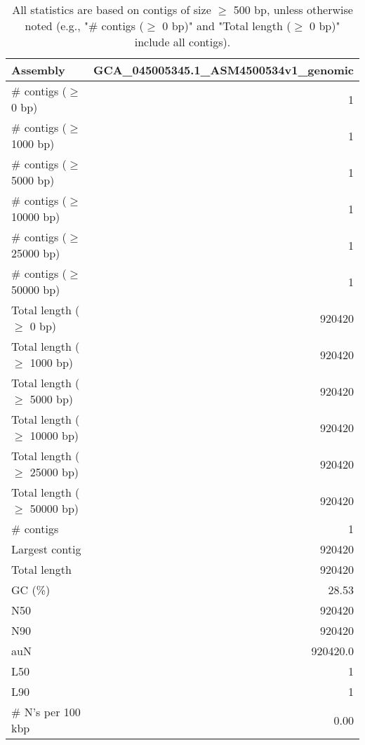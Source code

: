 \documentclass[12pt,a4paper]{article}
\begin{document}
\begin{table}[ht]
\begin{center}
\caption{All statistics are based on contigs of size $\geq$ 500 bp, unless otherwise noted (e.g., "\# contigs ($\geq$ 0 bp)" and "Total length ($\geq$ 0 bp)" include all contigs).}
\begin{tabular}{|l*{1}{|r}|}
\hline
Assembly & GCA\_045005345.1\_ASM4500534v1\_genomic \\ \hline
\# contigs ($\geq$ 0 bp) & 1 \\ \hline
\# contigs ($\geq$ 1000 bp) & 1 \\ \hline
\# contigs ($\geq$ 5000 bp) & 1 \\ \hline
\# contigs ($\geq$ 10000 bp) & 1 \\ \hline
\# contigs ($\geq$ 25000 bp) & 1 \\ \hline
\# contigs ($\geq$ 50000 bp) & 1 \\ \hline
Total length ($\geq$ 0 bp) & 920420 \\ \hline
Total length ($\geq$ 1000 bp) & 920420 \\ \hline
Total length ($\geq$ 5000 bp) & 920420 \\ \hline
Total length ($\geq$ 10000 bp) & 920420 \\ \hline
Total length ($\geq$ 25000 bp) & 920420 \\ \hline
Total length ($\geq$ 50000 bp) & 920420 \\ \hline
\# contigs & 1 \\ \hline
Largest contig & 920420 \\ \hline
Total length & 920420 \\ \hline
GC (\%) & 28.53 \\ \hline
N50 & 920420 \\ \hline
N90 & 920420 \\ \hline
auN & 920420.0 \\ \hline
L50 & 1 \\ \hline
L90 & 1 \\ \hline
\# N's per 100 kbp & 0.00 \\ \hline
\end{tabular}
\end{center}
\end{table}
\end{document}
